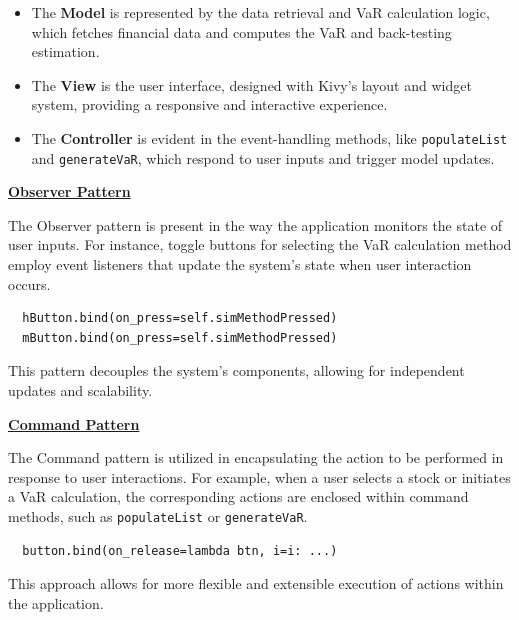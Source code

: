 \documentclass{article}
\begin{document}
\begin{itemize}
    \item The \textbf{Model} is represented by the data retrieval and VaR calculation logic, which fetches financial data and computes the VaR and back-testing estimation.
    \item The \textbf{View} is the user interface, designed with Kivy's layout and widget system, providing a responsive and interactive experience.
    \item The \textbf{Controller} is evident in the event-handling methods, like \texttt{populateList} and \texttt{generateVaR}, which respond to user inputs and trigger model updates.
\end{itemize}

\underline{\textbf{Observer Pattern}}\\\vspace{0.3cm}

The Observer pattern is present in the way the application monitors the state of user inputs. For instance, toggle buttons for selecting the VaR calculation method employ event listeners that update the system's state when user interaction occurs.

\begin{verbatim}
  hButton.bind(on_press=self.simMethodPressed)
  mButton.bind(on_press=self.simMethodPressed)
\end{verbatim}

This pattern decouples the system's components, allowing for independent updates and scalability.\\\vspace{0.3cm}

\underline{\textbf{Command Pattern}}\\\vspace{0.3cm}

The Command pattern is utilized in encapsulating the action to be performed in response to user interactions. For example, when a user selects a stock or initiates a VaR calculation, the corresponding actions are enclosed within command methods, such as \texttt{populateList} or \texttt{generateVaR}.

\begin{verbatim}
  button.bind(on_release=lambda btn, i=i: ...)
\end{verbatim}

This approach allows for more flexible and extensible execution of actions within the application.\\\vspace{0.3cm}
\end{document}
